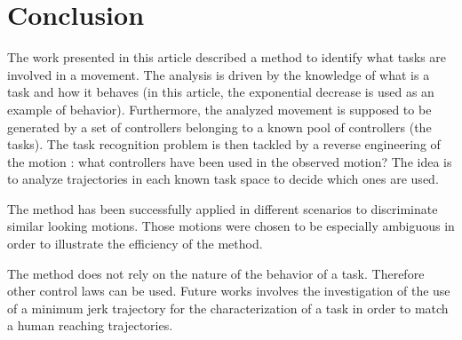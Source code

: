 \documentclass[letterpaper, 10pt, conference]{ieeeconf}      %
\begin{document}
\section{Conclusion}
The work presented in this article described a method to identify what tasks are involved in a movement.
The analysis is driven by the knowledge
of what is a task and how it behaves (in this article, the exponential decrease is used as an example of behavior). 
Furthermore, the analyzed movement is supposed to be generated by a set of 
controllers belonging to a known pool of controllers (the tasks). 
The task recognition problem is then tackled by a reverse engineering of the motion :
what controllers have been used in the observed motion? The idea is to analyze
trajectories in each known task space to decide which ones are used.

The method has been successfully applied in different
scenarios to discriminate similar looking motions. Those motions were chosen to be especially
ambiguous in order to illustrate the efficiency of the method.

The method does not rely on the nature of the behavior of a task. Therefore
other control laws can be used. Future works involves the investigation of the use of 
a minimum jerk trajectory for the characterization of a task in order to match
a human reaching trajectories. 



\end{document}
